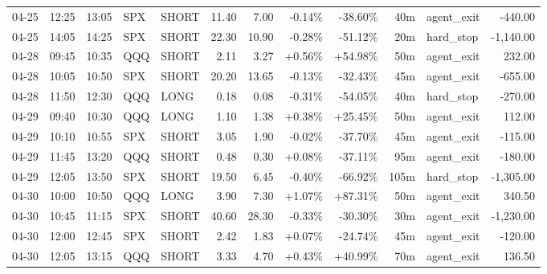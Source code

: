 \documentclass[11pt,a4paper,twoside]{article}
\begin{document}
\begin{center}
\begin{longtable}{>{\color{txtmain}}l l l l l r r r r r >{\color{txtmain}}l r}
04-25 & 12:25 & 13:05 & SPX & SHORT & 11.40 & 7.00 & \textcolor{lossred}{-0.14\%} & \textcolor{lossred}{-38.60\%} & 40m & agent\_exit & \textcolor{lossred}{-440.00} \\
04-25 & 14:05 & 14:25 & SPX & SHORT & 22.30 & 10.90 & \textcolor{lossred}{-0.28\%} & \textcolor{lossred}{-51.12\%} & 20m & hard\_stop & \textcolor{lossred}{-1,140.00} \\
04-28 & 09:45 & 10:35 & QQQ & SHORT & 2.11 & 3.27 & \textcolor{wingreen}{+0.56\%} & \textcolor{wingreen}{+54.98\%} & 50m & agent\_exit & \textcolor{wingreen}{232.00} \\
04-28 & 10:05 & 10:50 & SPX & SHORT & 20.20 & 13.65 & \textcolor{lossred}{-0.13\%} & \textcolor{lossred}{-32.43\%} & 45m & agent\_exit & \textcolor{lossred}{-655.00} \\
04-28 & 11:50 & 12:30 & QQQ & LONG & 0.18 & 0.08 & \textcolor{lossred}{-0.31\%} & \textcolor{lossred}{-54.05\%} & 40m & hard\_stop & \textcolor{lossred}{-270.00} \\
04-29 & 09:40 & 10:30 & QQQ & LONG & 1.10 & 1.38 & \textcolor{wingreen}{+0.38\%} & \textcolor{wingreen}{+25.45\%} & 50m & agent\_exit & \textcolor{wingreen}{112.00} \\
04-29 & 10:10 & 10:55 & SPX & SHORT & 3.05 & 1.90 & \textcolor{lossred}{-0.02\%} & \textcolor{lossred}{-37.70\%} & 45m & agent\_exit & \textcolor{lossred}{-115.00} \\
04-29 & 11:45 & 13:20 & QQQ & SHORT & 0.48 & 0.30 & \textcolor{wingreen}{+0.08\%} & \textcolor{lossred}{-37.11\%} & 95m & agent\_exit & \textcolor{lossred}{-180.00} \\
04-29 & 12:05 & 13:50 & SPX & SHORT & 19.50 & 6.45 & \textcolor{lossred}{-0.40\%} & \textcolor{lossred}{-66.92\%} & 105m & hard\_stop & \textcolor{lossred}{-1,305.00} \\
04-30 & 10:00 & 10:50 & QQQ & LONG & 3.90 & 7.30 & \textcolor{wingreen}{+1.07\%} & \textcolor{wingreen}{+87.31\%} & 50m & agent\_exit & \textcolor{wingreen}{340.50} \\
04-30 & 10:45 & 11:15 & SPX & SHORT & 40.60 & 28.30 & \textcolor{lossred}{-0.33\%} & \textcolor{lossred}{-30.30\%} & 30m & agent\_exit & \textcolor{lossred}{-1,230.00} \\
04-30 & 12:00 & 12:45 & SPX & SHORT & 2.42 & 1.83 & \textcolor{wingreen}{+0.07\%} & \textcolor{lossred}{-24.74\%} & 45m & agent\_exit & \textcolor{lossred}{-120.00} \\
04-30 & 12:05 & 13:15 & QQQ & SHORT & 3.33 & 4.70 & \textcolor{wingreen}{+0.43\%} & \textcolor{wingreen}{+40.99\%} & 70m & agent\_exit & \textcolor{wingreen}{136.50} \\

\end{longtable}
\end{center}
\end{document}
